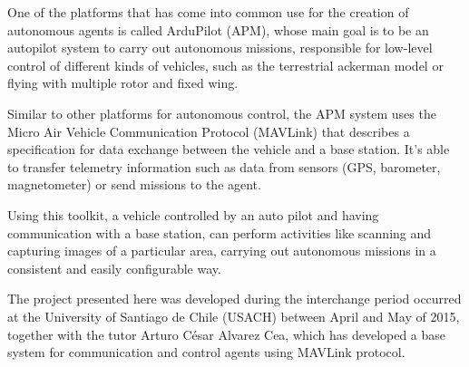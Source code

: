 One of the platforms that has come into common use for the creation of autonomous agents is called ArduPilot (APM), whose main goal is to be an autopilot system to carry out autonomous missions, responsible for low-level control of different kinds of vehicles, such as the terrestrial ackerman model or flying with multiple rotor and fixed wing.

Similar to other platforms for autonomous control, the APM system uses the Micro Air Vehicle Communication Protocol (MAVLink) that describes a specification for data exchange between the vehicle and a base station.
It's able to transfer telemetry information such as data from sensors (GPS, barometer, magnetometer) or send missions to the agent.

Using this toolkit, a vehicle controlled by an auto pilot and having communication with a base station, can perform activities like scanning and capturing images of a particular area, carrying out autonomous missions in a consistent and easily configurable way.


The project presented here was developed during the interchange period occurred at the University of Santiago de Chile (USACH) between April and May of 2015, together with the tutor Arturo César Alvarez Cea, which has developed a base system for communication and control agents using MAVLink protocol.

